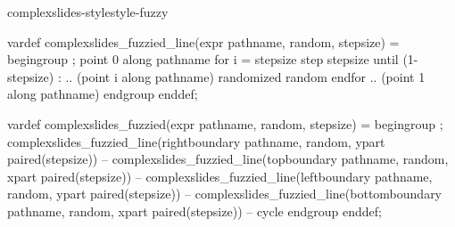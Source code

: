 \startmodule complexslides-stylestyle-fuzzy

\unprotect

\setupheader[\c!style=\bf\ssc, \c!color=foreground:1, \c!align=\v!middle, location=low]
\setupfooter[\c!style=small]

\setupheadertexts[{\getmarking[section]}]

\setuptexttexts[margin][\vbox{\placelist[slide]}][\vbox{\placelist[slide]}]





\setuplist
  [topic]
  [
    \c!pagenumber=\v!no,
     \c!expansion=\v!yes,
  ]



\startMPdefinitions
  vardef complexslides_fuzzied_line(expr pathname, random, stepsize) =
     begingroup ;
     point 0 along pathname
        for i = stepsize step stepsize until (1-stepsize) :
           .. (point i along pathname) randomized random
        endfor
           .. (point 1 along pathname)
     endgroup
  enddef;

  vardef complexslides_fuzzied(expr pathname, random, stepsize) =
     begingroup ;
           complexslides_fuzzied_line(rightboundary  pathname, random, ypart paired(stepsize))
        -- complexslides_fuzzied_line(topboundary    pathname, random, xpart paired(stepsize))
        -- complexslides_fuzzied_line(leftboundary   pathname, random, ypart paired(stepsize))
        -- complexslides_fuzzied_line(bottomboundary pathname, random, xpart paired(stepsize))
        -- cycle
     endgroup
  enddef;
\stopMPdefinitions

